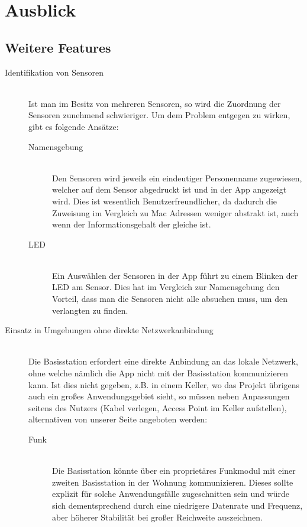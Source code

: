 \section{Ausblick}
\subsection{Weitere Features}
\begin{description}
	\item [Identifikation von Sensoren] \hfill \\
		Ist man im Besitz von mehreren Sensoren, so wird die Zuordnung der Sensoren zunehmend schwieriger. Um dem Problem entgegen zu wirken, gibt es folgende Ansätze:
		\begin{description}
			\item [Namensgebung] \hfill \\
				Den Sensoren wird jeweils ein eindeutiger Personenname zugewiesen, welcher auf dem Sensor abgedruckt ist und in der App angezeigt wird. Dies ist wesentlich Benutzerfreundlicher, da dadurch die Zuweisung im Vergleich zu Mac Adressen weniger abstrakt ist, auch wenn der Informationsgehalt der gleiche ist.
			\item [LED] \hfill \\
				Ein Auswählen der Sensoren in der App führt zu einem Blinken der LED am Sensor. Dies hat im Vergleich zur Namensgebung den Vorteil, dass man die Sensoren nicht alle absuchen muss, um den verlangten zu finden.
		\end{description}
	\item [Einsatz in Umgebungen ohne direkte Netzwerkanbindung] \hfill \\
		Die Basisstation erfordert eine direkte Anbindung an das lokale Netzwerk, ohne welche nämlich die App nicht mit der Basisstation kommunizieren kann. Ist dies nicht gegeben, z.B. in einem Keller, wo das Projekt übrigens auch ein großes Anwendungsgebiet sieht, so müssen neben Anpassungen seitens des Nutzers (Kabel verlegen, Access Point im Keller aufstellen), alternativen von unserer Seite angeboten werden:
		\begin{description}
			\item [Funk]  \hfill \\
				Die Basisstation könnte über ein proprietäres Funkmodul mit einer zweiten Basisstation in der Wohnung kommunizieren. Dieses sollte explizit für solche Anwendungsfälle zugeschnitten sein und würde sich dementsprechend durch eine niedrigere Datenrate und Frequenz, aber höherer Stabilität bei großer Reichweite auszeichnen.

\end{description}
\end{description}
